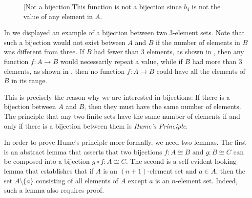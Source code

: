 \begin{figure}[t]
\begin{minipage}[t]{.45\textwidth}
%
    [Not a bijection]{This function is not a bijection since $b_4$ is not the value of any element in $A$.}%
    \label{figure:not-bijection-2}%
  \end{minipage}
\end{figure}
In  we displayed an example of a bijection between two $3$-element sets.
Note that such a bijection would not exist between $A$ and $B$ if the number of elements in $B$ was different from three.
If $B$ had fewer than $3$ elements, as shown in ,
then any function $f:A\to B$ would necessarily repeat a value,
while if $B$ had more than $3$ elements,
as shown in ,
then no function $f:A\to B$ could have all the elements of $B$ in its range.

This is precisely the reason why we are interested in bijections:
If there is a bijection between $A$ and $B$,
then they must have the same number of elements.
The principle that any two finite sets have the same number of elements if and only if there is a bijection between them is \emph{Hume's Principle}.

In order to prove Hume's principle more formally,
we need two lemmas.
The first is an abstract lemma that asserts that two bijections $f:A\cong B$ and $g:B\cong C$ can be composed into a bijection $g\circ f:A\cong C$.
The second is a self-evident looking lemma that establishes that if $A$ is an $(n+1)$-element set and $a\in A$,
then the set $A\setminus\{a\}$ consisting of all elements of $A$ except $a$ is an $n$-element set.
Indeed, such a lemma also requires proof.

